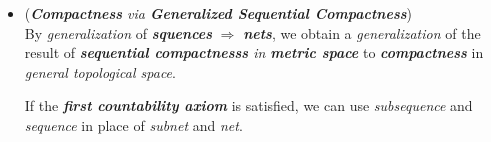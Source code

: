 \documentclass[11pt]{article}
\begin{document}
\begin{itemize}
\begin{proof}
To prove $\Leftarrow$, let $\srA$ be a collection of
\emph{\textbf{closed sets}} having \emph{the finite intersection property}, and let $\srB$ be the collection of
\emph{all finite intersections} of elements of $\srA$, \emph{\textbf{partially ordered}} by \emph{reverse inclusion}.
\end{proof}

\item \begin{remark} (\emph{\textbf{Compactness} via \textbf{Generalized Sequential Compactness}})\\
By \emph{generalization} of \emph{\textbf{squences}} $\Rightarrow$ \emph{\textbf{nets}}, we obtain a  \emph{generalization} of the result of \emph{\textbf{sequential compactnesss} in \textbf{metric space}} to \emph{\textbf{compactness}} in \emph{general topological space}.

If the \emph{\textbf{first countability axiom}} is satisfied, we can use \emph{subsequence} and \emph{sequence} in place of \emph{subnet} and \emph{net}.
\end{remark}
\end{itemize}
\end{document}
